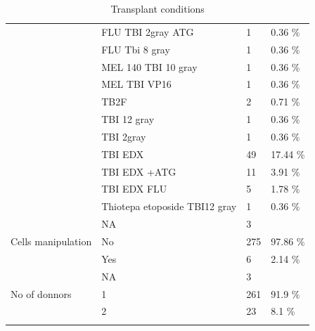 \documentclass[a4paper,11pt] {article}
\begin{document}
\begin{longtable}{llll}
   & FLU TBI 2gray ATG & 1 & 0.36 \% \\ 
   & FLU Tbi 8 gray & 1 & 0.36 \% \\ 
   & MEL 140 TBI 10 gray & 1 & 0.36 \% \\ 
   & MEL TBI VP16 & 1 & 0.36 \% \\ 
   & TB2F & 2 & 0.71 \% \\ 
   & TBI 12 gray & 1 & 0.36 \% \\ 
   & TBI 2gray & 1 & 0.36 \% \\ 
   & TBI EDX & 49 & 17.44 \% \\ 
   & TBI EDX +ATG & 11 & 3.91 \% \\ 
   & TBI EDX FLU & 5 & 1.78 \% \\ 
   & Thiotepa etoposide TBI12 gray & 1 & 0.36 \% \\ 
   & NA & 3 &  \\ 
  Cells manipulation & No & 275 & 97.86 \% \\ 
   & Yes & 6 & 2.14 \% \\ 
   & NA & 3 &  \\ 
  No of donnors & 1 & 261 & 91.9 \% \\ 
   & 2 & 23 & 8.1 \% \\ 
   \hline
\hline
\caption{Transplant conditions} 
\label{tab:g}
\end{longtable}
\pagebreak
\end{document}
